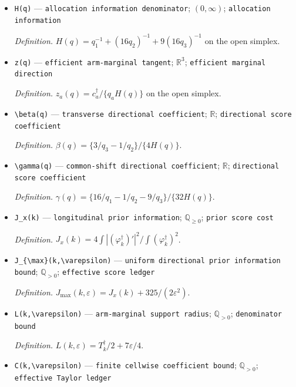 \documentclass{article}
\begin{document}
\begin{itemize}
  \par\smallskip\noindent\emph{Definition.} The response law in \(\mathrm{def:explicit\text{-}three\text{-}arm\text{-}airy\text{-}tube}\).
  \item \texttt{H(q)} --- \texttt{allocation information denominator}; \((0,\infty)\); \texttt{allocation information}
  \par\smallskip\noindent\emph{Definition.} \(H(q)=q_1^{-1}+(16q_2)^{-1}+9(16q_3)^{-1}\) on the open simplex.
  \item \texttt{z(q)} --- \texttt{efficient arm-\allowbreak{}marginal tangent}; \(\mathbb R^3\); \texttt{efficient marginal direction}
  \par\smallskip\noindent\emph{Definition.} \(z_a(q)=c_a^\dagger/\{q_aH(q)\}\) on the open simplex.
  \item \texttt{\textbackslash{}\allowbreak{}beta(q)} --- \texttt{transverse directional coefficient}; \(\mathbb R\); \texttt{directional score coefficient}
  \par\smallskip\noindent\emph{Definition.} \(\beta(q)=\{3/q_3-1/q_2\}/\{4H(q)\}\).
  \item \texttt{\textbackslash{}\allowbreak{}gamma(q)} --- \texttt{common-\allowbreak{}shift directional coefficient}; \(\mathbb R\); \texttt{directional score coefficient}
  \par\smallskip\noindent\emph{Definition.} \(\gamma(q)=\{16/q_1-1/q_2-9/q_3\}/\{32H(q)\}\).
  \item \texttt{J\_\allowbreak{}x(k)} --- \texttt{longitudinal prior information}; \(\mathbb Q_{\ge0}\); \texttt{prior score cost}
  \par\smallskip\noindent\emph{Definition.} \(J_x(k)=4\int|(\varphi_k^\dagger)'|^2/\int(\varphi_k^\dagger)^2\).
  \item \texttt{J\_\allowbreak{}\{\textbackslash{}\allowbreak{}max\}\allowbreak{}(k,\allowbreak{}\textbackslash{}\allowbreak{}varepsilon)} --- \texttt{uniform directional prior information bound}; \(\mathbb Q_{>0}\); \texttt{effective score ledger}
  \par\smallskip\noindent\emph{Definition.} \(J_{\max}(k,\varepsilon)=J_x(k)+325/(2\varepsilon^2)\).
  \item \texttt{L(k,\allowbreak{}\textbackslash{}\allowbreak{}varepsilon)} --- \texttt{arm-\allowbreak{}marginal support radius}; \(\mathbb Q_{>0}\); \texttt{denominator bound}
  \par\smallskip\noindent\emph{Definition.} \(L(k,\varepsilon)=T_k^\dagger/2+7\varepsilon/4\).
  \item \texttt{C(k,\allowbreak{}\textbackslash{}\allowbreak{}varepsilon)} --- \texttt{finite cellwise coefficient bound}; \(\mathbb Q_{>0}\); \texttt{effective Taylor ledger}

\end{itemize}
\end{document}

